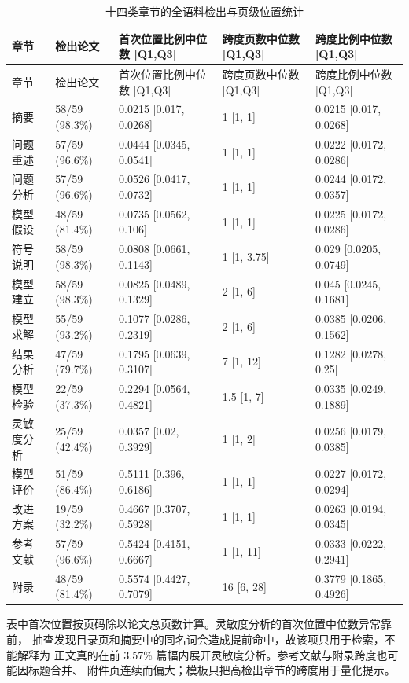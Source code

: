\documentclass[UTF8,a4paper,12pt]{ctexart}
\begin{document}
\begin{longtable}{p{1.8cm}p{2.5cm}p{3.0cm}p{2.8cm}p{3.0cm}}
\caption{十四类章节的全语料检出与页级位置统计}\label{tab:section-stats}\\
\toprule
章节 & 检出论文 & 首次位置比例中位数 [Q1,Q3] & 跨度页数中位数 [Q1,Q3] & 跨度比例中位数 [Q1,Q3]\\
\midrule
\endfirsthead
\toprule
章节 & 检出论文 & 首次位置比例中位数 [Q1,Q3] & 跨度页数中位数 [Q1,Q3] & 跨度比例中位数 [Q1,Q3]\\
\midrule
\endhead
摘要 & 58/59 (98.3\%) & 0.0215 [0.017, 0.0268] & 1 [1, 1] & 0.0215 [0.017, 0.0268]\\
问题重述 & 57/59 (96.6\%) & 0.0444 [0.0345, 0.0541] & 1 [1, 1] & 0.0222 [0.0172, 0.0286]\\
问题分析 & 57/59 (96.6\%) & 0.0526 [0.0417, 0.0732] & 1 [1, 1] & 0.0244 [0.0172, 0.0357]\\
模型假设 & 48/59 (81.4\%) & 0.0735 [0.0562, 0.106] & 1 [1, 1] & 0.0225 [0.0172, 0.0286]\\
符号说明 & 58/59 (98.3\%) & 0.0808 [0.0661, 0.1143] & 1 [1, 3.75] & 0.029 [0.0205, 0.0749]\\
模型建立 & 58/59 (98.3\%) & 0.0825 [0.0489, 0.1329] & 2 [1, 6] & 0.045 [0.0245, 0.1681]\\
模型求解 & 55/59 (93.2\%) & 0.1077 [0.0286, 0.2319] & 2 [1, 6] & 0.0385 [0.0206, 0.1562]\\
结果分析 & 47/59 (79.7\%) & 0.1795 [0.0639, 0.3107] & 7 [1, 12] & 0.1282 [0.0278, 0.25]\\
模型检验 & 22/59 (37.3\%) & 0.2294 [0.0564, 0.4821] & 1.5 [1, 7] & 0.0335 [0.0249, 0.1889]\\
灵敏度分析 & 25/59 (42.4\%) & 0.0357 [0.02, 0.3929] & 1 [1, 2] & 0.0256 [0.0179, 0.0385]\\
模型评价 & 51/59 (86.4\%) & 0.5111 [0.396, 0.6186] & 1 [1, 1] & 0.0227 [0.0172, 0.0294]\\
改进方案 & 19/59 (32.2\%) & 0.4667 [0.3707, 0.5928] & 1 [1, 1] & 0.0263 [0.0194, 0.0345]\\
参考文献 & 57/59 (96.6\%) & 0.5424 [0.4151, 0.6667] & 1 [1, 11] & 0.0333 [0.0222, 0.2941]\\
附录 & 48/59 (81.4\%) & 0.5574 [0.4427, 0.7079] & 16 [6, 28] & 0.3779 [0.1865, 0.4926]\\
\bottomrule
\end{longtable}

表中首次位置按页码除以论文总页数计算。灵敏度分析的首次位置中位数异常靠前，
抽查发现目录页和摘要中的同名词会造成提前命中，故该项只用于检索，不能解释为
正文真的在前 3.57\% 篇幅内展开灵敏度分析。参考文献与附录跨度也可能因标题合并、
附件页连续而偏大；模板只把高检出章节的跨度用于量化提示。
\end{document}
